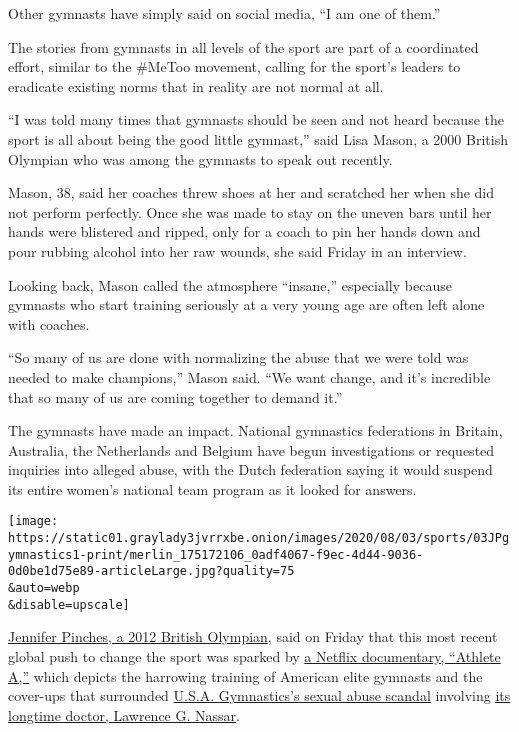 Other gymnasts have simply said on social media, ``I am one of them.''

The stories from gymnasts in all levels of the sport are part of a
coordinated effort, similar to the \#MeToo movement, calling for the
sport's leaders to eradicate existing norms that in reality are not
normal at all.

``I was told many times that gymnasts should be seen and not heard
because the sport is all about being the good little gymnast,'' said
Lisa Mason, a 2000 British Olympian who was among the gymnasts to speak
out recently.

Mason, 38, said her coaches threw shoes at her and scratched her when
she did not perform perfectly. Once she was made to stay on the uneven
bars until her hands were blistered and ripped, only for a coach to pin
her hands down and pour rubbing alcohol into her raw wounds, she said
Friday in an interview.

Looking back, Mason called the atmosphere ``insane,'' especially because
gymnasts who start training seriously at a very young age are often left
alone with coaches.

``So many of us are done with normalizing the abuse that we were told
was needed to make champions,'' Mason said. ``We want change, and it's
incredible that so many of us are coming together to demand it.''

The gymnasts have made an impact. National gymnastics federations in
Britain, Australia, the Netherlands and Belgium have begun
investigations or requested inquiries into alleged abuse, with the Dutch
federation saying it would suspend its entire women's national team
program as it looked for answers.

\texttt{[image: https://static01.graylady3jvrrxbe.onion/images/2020/08/03/sports/03JPgymnastics1-print/merlin\_175172106\_0adf4067-f9ec-4d44-9036-0d0be1d75e89-articleLarge.jpg?quality=75\\\&auto=webp\\\&disable=upscale]}

\href{https://www.telegraph.co.uk/gymnastics/2020/07/08/culture-fear-permeating-whole-gymnastics-has-stop/}{Jennifer
Pinches, a 2012 British Olympian}, said on Friday that this most recent
global push to change the sport was sparked by
\href{https://www.nytimes3xbfgragh.onion/2020/06/24/movies/athlete-a-review.html}{a
Netflix documentary, ``Athlete A,''} which depicts the harrowing
training of American elite gymnasts and the cover-ups that surrounded
\href{https://www.nytimes3xbfgragh.onion/2020/03/03/sports/olympics/biles-gymnastics-settlement-nassar.html?searchResultPosition=3}{U.S.A.
Gymnastics's sexual abuse scandal} involving
\href{https://www.nytimes3xbfgragh.onion/video/us/100000005698488/larry-nassar-gymnastics-sex-abuse.html?searchResultPosition=7}{its
longtime doctor, Lawrence G. Nassar}.

